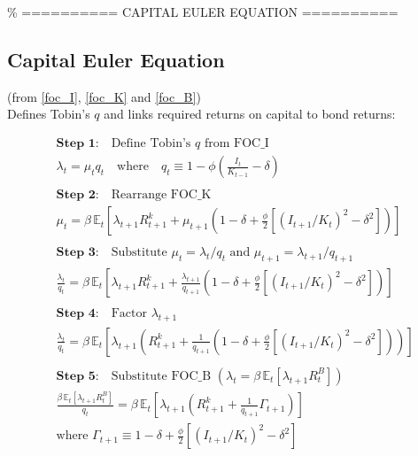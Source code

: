 \documentclass[11pt,preprint]{elsarticle}
\numberwithin{equation}{section}
\numberwithin{figure}{section}
\numberwithin{table}{section}
\begin{document}
\% ========== CAPITAL EULER EQUATION ==========

\subsection*{Capital Euler Equation}

(from \eqref{foc_I}, \eqref{foc_K} and \eqref{foc_B})\\
Defines Tobin's \(q\) and links required returns on capital to bond
returns:

\begin{align*}
& \textbf{Step 1:} \quad \text{Define Tobin's } q \text{ from FOC\_I} \\
& \lambda_t = \mu_t q_t \quad \text{where} \quad q_t \equiv 1 - \phi\left(\tfrac{I_t}{K_{t-1}} - \delta\right) \\
& \\
& \textbf{Step 2:} \quad \text{Rearrange FOC\_K} \\
& \mu_t = \beta\,\mathbb{E}_t\!\left[ \lambda_{t+1}R_{t+1}^k + \mu_{t+1}\!\left(1-\delta + \tfrac{\phi}{2}\left[(I_{t+1}/K_t)^2 - \delta^2\right]\right) \right] \\
& \\
& \textbf{Step 3:} \quad \text{Substitute } \mu_t = \lambda_t / q_t \text{ and } \mu_{t+1} = \lambda_{t+1} / q_{t+1} \\
& \frac{\lambda_t}{q_t} = \beta\,\mathbb{E}_t\!\left[ \lambda_{t+1}R_{t+1}^k + \frac{\lambda_{t+1}}{q_{t+1}}\left(1-\delta + \tfrac{\phi}{2}\left[(I_{t+1}/K_t)^2 - \delta^2\right]\right) \right] \\
& \\
& \textbf{Step 4:} \quad \text{Factor } \lambda_{t+1} \\
& \frac{\lambda_t}{q_t} = \beta\,\mathbb{E}_t\!\left[ \lambda_{t+1} \left( R_{t+1}^k + \frac{1}{q_{t+1}}\left(1-\delta + \tfrac{\phi}{2}\left[(I_{t+1}/K_t)^2 - \delta^2\right]\right) \right) \right] \\
& \\
& \textbf{Step 5:} \quad \text{Substitute FOC\_B } (\lambda_t = \beta\,\mathbb{E}_t[\lambda_{t+1}R_t^B]) \\
& \frac{\beta\,\mathbb{E}_t[\lambda_{t+1}R_t^B]}{q_t} = \beta\,\mathbb{E}_t\!\left[ \lambda_{t+1} \left( R_{t+1}^k + \frac{1}{q_{t+1}}\Gamma_{t+1} \right) \right] \\
& \text{where } \Gamma_{t+1} \equiv 1-\delta + \tfrac{\phi}{2}\left[(I_{t+1}/K_t)^2 - \delta^2\right]
\end{align*}
\end{document}
